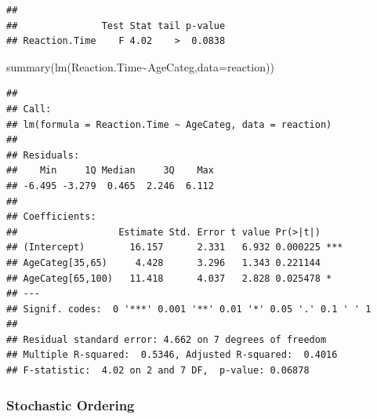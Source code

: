 \documentclass[
]{article}
\newenvironment{Shaded}{\begin{snugshade}}{\end{snugshade}}
\newcommand{\AttributeTok}[1]{\textcolor[rgb]{0.77,0.63,0.00}{#1}}
\newcommand{\ConstantTok}[1]{\textcolor[rgb]{0.00,0.00,0.00}{#1}}
\newcommand{\DecValTok}[1]{\textcolor[rgb]{0.00,0.00,0.81}{#1}}
\newcommand{\FunctionTok}[1]{\textcolor[rgb]{0.00,0.00,0.00}{#1}}
\newcommand{\NormalTok}[1]{#1}
\newcommand{\OtherTok}[1]{\textcolor[rgb]{0.56,0.35,0.01}{#1}}
\newcommand{\SpecialCharTok}[1]{\textcolor[rgb]{0.00,0.00,0.00}{#1}}
\newcommand{\StringTok}[1]{\textcolor[rgb]{0.31,0.60,0.02}{#1}}
\begin{document}
\begin{Shaded}
\end{Shaded}

\begin{verbatim}
## 
##               Test Stat tail p-value
## Reaction.Time    F 4.02    >  0.0838
\end{verbatim}

\begin{Shaded}
\begin{Highlighting}[]
\FunctionTok{summary}\NormalTok{(}\FunctionTok{lm}\NormalTok{(Reaction.Time}\SpecialCharTok{\textasciitilde{}}\NormalTok{AgeCateg,}\AttributeTok{data=}\NormalTok{reaction))}
\end{Highlighting}
\end{Shaded}

\begin{verbatim}
## 
## Call:
## lm(formula = Reaction.Time ~ AgeCateg, data = reaction)
## 
## Residuals:
##    Min     1Q Median     3Q    Max 
## -6.495 -3.279  0.465  2.246  6.112 
## 
## Coefficients:
##                  Estimate Std. Error t value Pr(>|t|)    
## (Intercept)        16.157      2.331   6.932 0.000225 ***
## AgeCateg[35,65)     4.428      3.296   1.343 0.221144    
## AgeCateg[65,100)   11.418      4.037   2.828 0.025478 *  
## ---
## Signif. codes:  0 '***' 0.001 '**' 0.01 '*' 0.05 '.' 0.1 ' ' 1
## 
## Residual standard error: 4.662 on 7 degrees of freedom
## Multiple R-squared:  0.5346, Adjusted R-squared:  0.4016 
## F-statistic:  4.02 on 2 and 7 DF,  p-value: 0.06878
\end{verbatim}

\hypertarget{stochastic-ordering}{%
\subsubsection{Stochastic Ordering}\label{stochastic-ordering}}
\end{document}
